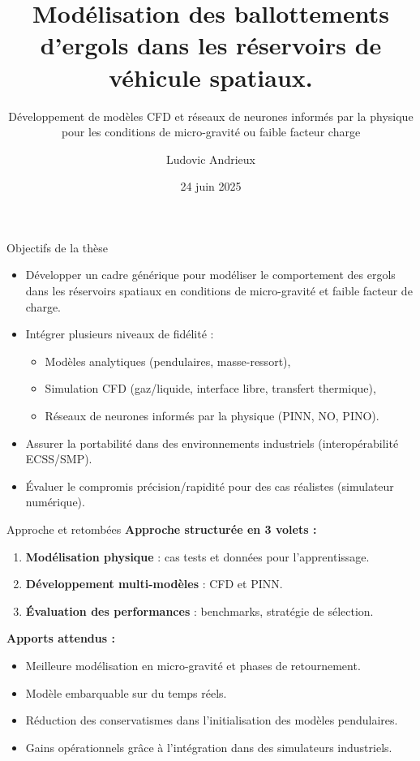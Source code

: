 \documentclass{beamer}
\title[Proposition de thèse]{Modélisation des ballottements d’ergols dans les réservoirs de véhicule spatiaux.}
\subtitle{Développement de modèles CFD et réseaux de neurones informés par la physique pour les conditions de micro-gravité ou faible facteur charge}
\author{Ludovic Andrieux}
\date{24 juin 2025}
\begin{document}
	
	\frame{\titlepage}
	
	\begin{frame}{Objectifs de la thèse}
		\begin{itemize}
			\item Développer un cadre générique pour modéliser le comportement des ergols dans les réservoirs spatiaux en conditions de micro-gravité et faible facteur de charge.
			\item Intégrer plusieurs niveaux de fidélité :
			\begin{itemize}
				\item Modèles analytiques (pendulaires, masse-ressort),
				\item Simulation CFD (gaz/liquide, interface libre, transfert thermique),
				\item Réseaux de neurones informés par la physique (PINN, NO, PINO).
			\end{itemize}
			\item Assurer la portabilité dans des environnements industriels (interopérabilité ECSS/SMP).
			\item Évaluer le compromis précision/rapidité pour des cas réalistes (simulateur numérique).
		\end{itemize}
	\end{frame}
	
	\begin{frame}{Approche et retombées}
		\textbf{Approche structurée en 3 volets :}
		\begin{enumerate}
			\item \textbf{Modélisation physique} : cas tests et données pour l’apprentissage.
			\item \textbf{Développement multi-modèles} : CFD et PINN.
			\item \textbf{Évaluation des performances} : benchmarks, stratégie de sélection.
		\end{enumerate}
		\vspace{0.5cm}
		\textbf{Apports attendus :}
		\begin{itemize}
			\item Meilleure modélisation en micro-gravité et phases de retournement.
			\item Modèle embarquable sur du temps réels.
			\item Réduction des conservatismes dans l’initialisation des modèles pendulaires.
			\item Gains opérationnels grâce à l’intégration dans des simulateurs industriels.
		\end{itemize}
	\end{frame}
	
\end{document}
